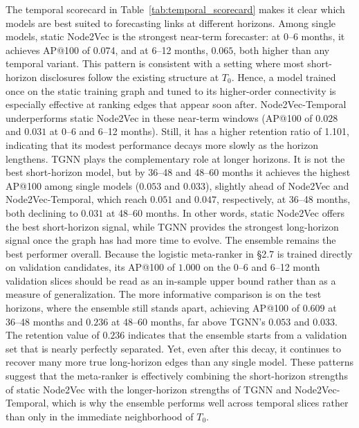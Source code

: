 The temporal scorecard in Table~\ref{tab:temporal_scorecard} makes it clear which models are best suited to forecasting links at different horizons. Among single models, static Node2Vec is the strongest near-term forecaster: at 0--6 months, it achieves AP@100 of 0.074, and at 6--12 months, \(0.065\), both higher than any temporal variant. This pattern is consistent with a setting where most short-horizon disclosures follow the existing structure at \(T_0\). Hence, a model trained once on the static training graph and tuned to its higher-order connectivity is especially effective at ranking edges that appear soon after. Node2Vec-Temporal underperforms static Node2Vec in these near-term windows (AP@100 of \(0.028\) and \(0.031\) at 0--6 and 6--12 months). Still, it has a higher retention ratio of 1.101, indicating that its modest performance decays more slowly as the horizon lengthens. TGNN plays the complementary role at longer horizons. It is not the best short-horizon model, but by 36--48 and 48--60 months it achieves the highest AP@100 among single models (\(0.053\) and \(0.033\)), slightly ahead of Node2Vec and Node2Vec-Temporal, which reach \(0.051\) and \(0.047\), respectively, at 36--48 months, both declining to \(0.031\) at 48--60 months. In other words, static Node2Vec offers the best short-horizon signal, while TGNN provides the strongest long-horizon signal once the graph has had more time to evolve. The ensemble remains the best performer overall. Because the logistic meta-ranker in \S2.7 is trained directly on validation candidates, its AP@100 of \(1.000\) on the 0--6 and 6--12 month validation slices should be read as an in-sample upper bound rather than as a measure of generalization. The more informative comparison is on the test horizons, where the ensemble still stands apart, achieving AP@100 of \(0.609\) at 36--48 months and \(0.236\) at 48--60 months, far above TGNN's \(0.053\) and \(0.033\). The retention value of \(0.236\) indicates that the ensemble starts from a validation set that is nearly perfectly separated. Yet, even after this decay, it continues to recover many more true long-horizon edges than any single model. These patterns suggest that the meta-ranker is effectively combining the short-horizon strengths of static Node2Vec with the longer-horizon strengths of TGNN and Node2Vec-Temporal, which is why the ensemble performs well across temporal slices rather than only in the immediate neighborhood of \(T_0\).


